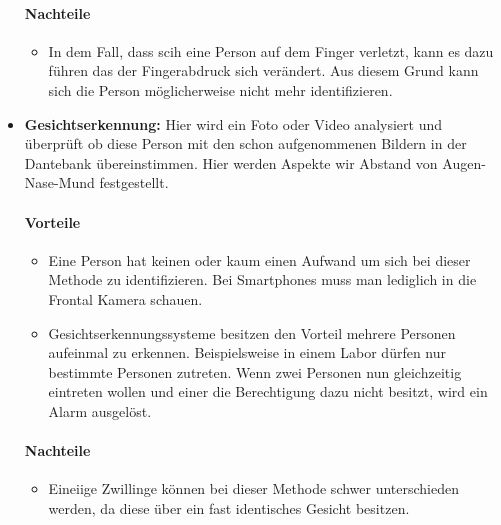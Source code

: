 \begin{itemize}
	\paragraph{Nachteile}
	\begin{itemize}
		\item In dem Fall, dass scih eine Person auf dem Finger verletzt, kann es dazu führen das der Fingerabdruck sich verändert. Aus diesem Grund kann sich die Person möglicherweise nicht mehr identifizieren.
	\end{itemize}
	\item \textbf{Gesichtserkennung:} Hier wird ein Foto oder Video analysiert und überprüft ob diese Person mit den schon aufgenommenen Bildern in der Dantebank übereinstimmen. Hier werden Aspekte wir Abstand von Augen-Nase-Mund festgestellt.
	\paragraph{Vorteile}
	\begin{itemize}
		\item Eine Person hat keinen oder kaum einen Aufwand um sich bei dieser Methode zu identifizieren. Bei Smartphones muss man lediglich in die Frontal Kamera schauen.
		\item Gesichtserkennungssysteme besitzen den Vorteil mehrere Personen aufeinmal zu erkennen. Beispielsweise in einem Labor dürfen nur bestimmte Personen zutreten. Wenn zwei Personen nun gleichzeitig eintreten wollen und einer die Berechtigung dazu nicht besitzt, wird ein Alarm ausgelöst.
	\end{itemize}
	\paragraph{Nachteile}
	\begin{itemize}
		\item Eineiige Zwillinge können bei dieser Methode schwer unterschieden werden, da diese über ein fast identisches Gesicht besitzen.
	\end{itemize}
\end{itemize}

